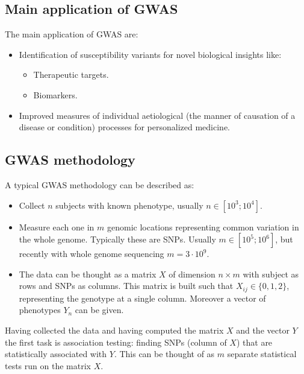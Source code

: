 	\subsection{Main application of GWAS}
	The main application of GWAS are:

	\begin{multicols}{2}
		\begin{itemize}
			\item Identification of susceptibility variants for novel biological insights like:

				\begin{itemize}
					\item Therapeutic targets.
					\item Biomarkers.
				\end{itemize}

			\item Improved measures of individual aetiological (the manner of causation of a disease or condition) processes for personalized medicine.
		\end{itemize}
	\end{multicols}

	\subsection{GWAS methodology}
	A typical GWAS methodology can be described as:

	\begin{multicols}{2}
		\begin{itemize}
			\item Collect $n$ subjects with known phenotype, usually $n\in [10^3;10^4]$.
			\item Measure each one in $m$ genomic locations representing common variation in the whole genome.
				Typically these are SNPs.
				Usually $m\in [10^5;10^6]$, but recently with whole genome sequencing $m = 3\cdot 10^9$.
			\item The data can be thought as a matrix $X$ of dimension $n\times m$ with subject as rows and SNPs as columns.
				This matrix is built such that $X_{ij} \in \{0,1,2\}$, representing the genotype at a single column.
				Moreover a vector of phenotypes $Y_n$ can be given.
		\end{itemize}
	\end{multicols}

	Having collected the data and having computed the matrix $X$ and the vector $Y$ the first task is association testing: finding SNPs (column of $X$) that are statistically associated with $Y$.
	This can be thought of as $m$ separate statistical tests run on the matrix $X$.

